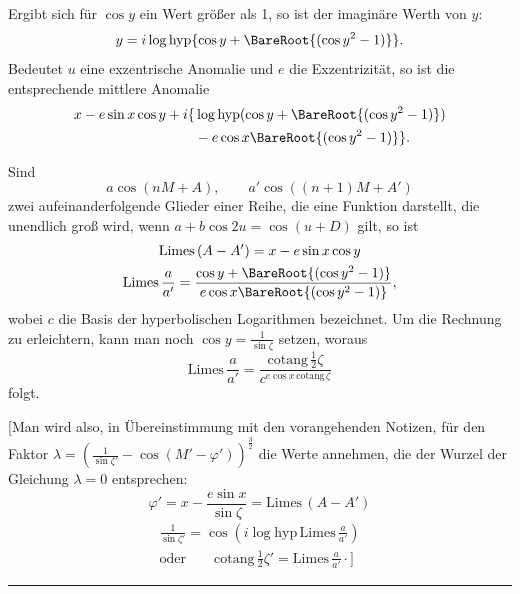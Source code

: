Ergibt sich für \(\cos y\) ein Wert größer als 1, so ist der imaginäre
Werth von \(y\):
\[
y=i\log\mathrm{hyp}\{\cos y+\BareRoot{(\cos y^2-1)}\}.
\]
\noindent Bedeutet \(u\) eine exzentrische Anomalie und \(e\) die Exzentrizität, so ist
die entsprechende mittlere Anomalie
\[
\begin{aligned}
x-e\sin x\cos y+i\{&\log\mathrm{hyp}(\cos y+\BareRoot{(\cos y^2-1)})\\
&-e\cos x\BareRoot{(\cos y^2-1)}\}.
\end{aligned}
\]
\par\noindent\hspace*{\parindent}Sind
\[
a\cos(nM+A),\qquad a'\cos((n+1)M+A')
\]
\noindent zwei aufeinanderfolgende Glieder einer Reihe, die eine Funktion darstellt,
die unendlich groß wird, wenn \(a+b\cos2u=\cos(u+D)\) gilt, so ist
\[
\begin{gathered}
\mathrm{Limes}\,(A-A')=x-e\sin x\cos y\\
\mathrm{Limes}\,\frac a{a'}=\frac{\cos y+\BareRoot{(\cos y^2-1)}}{e\cos x\BareRoot{(\cos y^2-1)}},
\end{gathered}
\]
\noindent wobei \(c\) die Basis der hyperbolischen Logarithmen bezeichnet. Um die
Rechnung zu erleichtern, kann man noch \(\cos y=\frac1{\sin\zeta}\) setzen, woraus
\[
\mathrm{Limes}\,\frac a{a'}=\frac{\mathrm{cotang}\,\frac12\zeta}{c^{e\cos x\,\mathrm{cotang}\,\zeta}}
\]
\noindent folgt.
\par\noindent\hspace*{\parindent}[Man wird also, in Übereinstimmung mit den vorangehenden Notizen, für den Faktor
\(\lambda=\left(\frac1{\sin\zeta'}-\cos(M'-\varphi')\right)^{\frac32}\) die Werte annehmen,
die der Wurzel der Gleichung \(\lambda=0\) entsprechen:
\[
\varphi'=x-\frac{e\sin x}{\sin\zeta}=\mathrm{Limes}\,(A-A')
\]
\[
\begin{gathered}
\frac1{\sin\zeta'}=\cos\left(i\log\mathrm{hyp}\,\mathrm{Limes}\,\frac a{a'}\right)\\
\text{oder}\qquad \mathrm{cotang}\,\tfrac12\zeta'=\mathrm{Limes}\,\frac a{a'}\mathpunct{\cdot}\Biggr]
\end{gathered}
\]
\par\medskip\begin{center}\rule{4em}{.4pt}\end{center}
\endgroup

\clearpage
\endgroup
